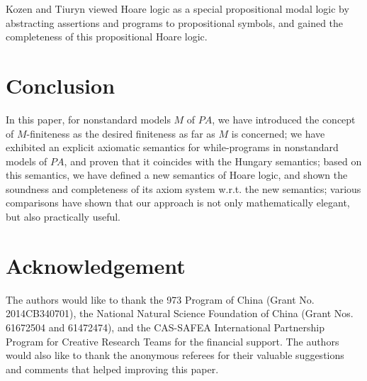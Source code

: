 \documentclass[a4paper,11pt]{article}
\begin{document}
Kozen and Tiuryn \cite{kozen_1} viewed Hoare logic as a special propositional modal logic by abstracting assertions and programs to propositional symbols, and gained the completeness of this propositional Hoare logic.

\section{Conclusion}
In this paper, for nonstandard models $M$ of $PA$, we have introduced the concept of $M$-finiteness as the desired finiteness as far as $M$ is concerned; we have exhibited an explicit axiomatic semantics for while-programs in nonstandard models of $PA$, and proven that it coincides with the Hungary semantics; based on this semantics, we have defined a new semantics of Hoare logic, and shown the soundness and completeness of its axiom system w.r.t. the new semantics; various comparisons have shown that our approach is not only mathematically elegant, but also practically useful.

\section*{Acknowledgement}
The authors would like to thank the 973 Program of China (Grant No. 2014CB340701), the National Natural Science Foundation of China (Grant Nos. 61672504 and 61472474), and the CAS-SAFEA International Partnership Program for Creative Research Teams for the financial support. The authors would also like to thank the anonymous referees for their valuable suggestions and comments that helped improving this paper.
\end{document}
